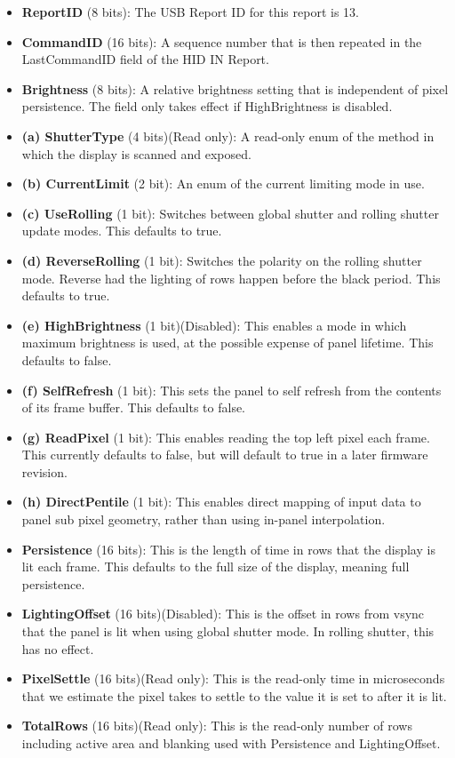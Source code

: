 \documentclass[letterpaper]{article}
\begin{document}
\begin{itemize}
  \item {\bfseries ReportID} (8 bits): The USB Report ID for this report is 13.
  \item {\bfseries CommandID} (16 bits): A sequence number that is then repeated in the LastCommandID field of the HID IN Report.
  \item {\bfseries Brightness} (8 bits): A relative brightness setting that is independent of pixel persistence.  The field only takes effect if HighBrightness is disabled. 
  \item {\bfseries (a) ShutterType} (4 bits)(Read only): A read-only enum of the method in which the display is scanned and exposed.
  \item {\bfseries (b) CurrentLimit} (2 bit): An enum of the current limiting mode in use.
  \item {\bfseries (c) UseRolling} (1 bit): Switches between global shutter and rolling shutter update modes.  This defaults to true.
  \item {\bfseries (d) ReverseRolling} (1 bit): Switches the polarity on the rolling shutter mode.  Reverse had the lighting of rows happen before the black period.  This defaults to true.
  \item {\bfseries (e) HighBrightness} (1 bit)(Disabled): This enables a mode in which maximum brightness is used, at the possible expense of panel lifetime.  This defaults to false.
  \item {\bfseries (f) SelfRefresh} (1 bit): This sets the panel to self refresh from the contents of its frame buffer.  This defaults to false.
  \item {\bfseries (g) ReadPixel} (1 bit): This enables reading the top left pixel each frame.  This currently defaults to false, but will default to true in a later firmware revision.
  \item {\bfseries (h) DirectPentile} (1 bit): This enables direct mapping of input data to panel sub pixel geometry, rather than using in-panel interpolation.
  \item {\bfseries Persistence} (16 bits): This is the length of time in rows that the display is lit each frame.  This defaults to the full size of the display, meaning full persistence.
  \item {\bfseries LightingOffset} (16 bits)(Disabled): This is the offset in rows from vsync that the panel is lit when using global shutter mode.  In rolling shutter, this has no effect.
  \item {\bfseries PixelSettle} (16 bits)(Read only): This is the read-only time in microseconds that we estimate the pixel takes to settle to the value it is set to after it is lit.
  \item {\bfseries TotalRows} (16 bits)(Read only): This is the read-only number of rows including active area and blanking used with Persistence and LightingOffset.
\end{itemize}
\end{document}
